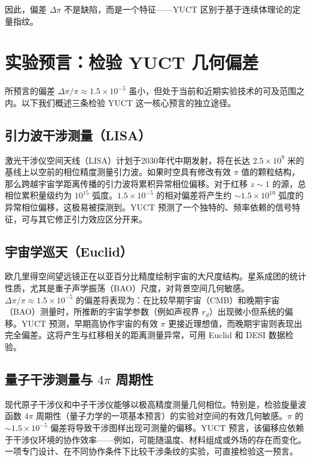 \documentclass[12pt,a4paper]{article}
\begin{document}
	因此，偏差 \(\Delta\pi\) 不是缺陷，而是一个特征——YUCT 区别于基于连续体理论的定量指纹。
	
	\section{实验预言：检验 YUCT 几何偏差}
	
	所预言的偏差 \(\Delta\pi/\pi \approx 1.5\times10^{-5}\) 虽小，但处于当前和近期实验技术的可及范围之内。以下我们概述三条检验 YUCT 这一核心预言的独立途径。
	
	\subsection{引力波干涉测量（LISA）}
	
	激光干涉仪空间天线（LISA）计划于2030年代中期发射，将在长达 \(2.5\times10^9\) 米的基线上以空前的相位精度测量引力波。如果时空具有修改有效 \(\pi\) 值的颗粒结构，那么跨越宇宙学距离传播的引力波将累积异常相位偏移。对于红移 \(z \sim 1\) 的源，总相位累积量级约为 \(10^{15}\) 弧度。\(1.5\times10^{-5}\) 的相对偏差将产生约 \(\sim 1.5\times10^{10}\) 弧度的异常相位偏移，这极易被探测到。YUCT 预测了一个独特的、频率依赖的信号特征，可与其它修正引力效应区分开来。
	
	\subsection{宇宙学巡天（Euclid）}
	
	欧几里得空间望远镜正在以亚百分比精度绘制宇宙的大尺度结构。星系成团的统计性质，尤其是重子声学振荡（BAO）尺度，对背景空间几何敏感。\(\Delta\pi/\pi \approx 1.5\times10^{-5}\) 的偏差将表现为：在比较早期宇宙（CMB）和晚期宇宙（BAO）测量时，所推断的宇宙学参数（例如声视界 \(r_d\)）出现微小但系统的偏移。YUCT 预测，早期高协作宇宙的有效 \(\pi\) 更接近理想值，而晚期宇宙则表现出完全偏差。这将产生与红移相关的距离测量异常，可用 Euclid 和 DESI 数据检验。
	
	\subsection{量子干涉测量与 \(4\pi\) 周期性}
	
	现代原子干涉仪和中子干涉仪能够以极高精度测量几何相位。特别是，检验旋量波函数 \(4\pi\) 周期性（量子力学的一项基本预言）的实验对空间的有效几何敏感。\(\pi\) 的 \(\sim 1.5\times10^{-5}\) 偏差将导致干涉图样出现可测量的偏移。YUCT 预言，该偏移应依赖于干涉仪环境的协作效率——例如，可能随温度、材料组成或外场的存在而变化。一项专门设计、在不同协作条件下比较干涉条纹的实验，可直接检验这一预言。
	
\end{document}
